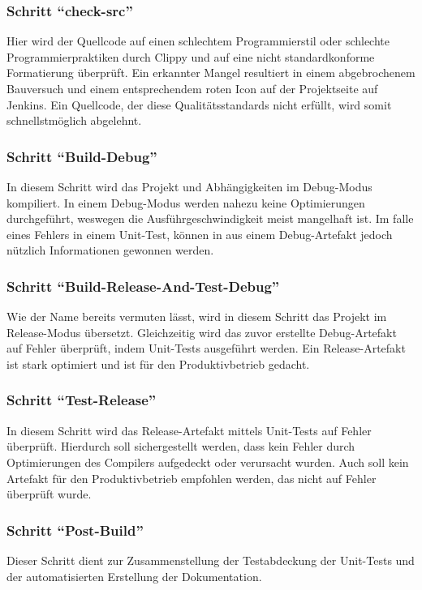 \subsubsection{Schritt \enquote{check-src}}
Hier wird der Quellcode auf einen schlechtem Programmierstil oder schlechte Programmierpraktiken durch Clippy und auf eine nicht standardkonforme Formatierung überprüft.
Ein erkannter Mangel resultiert in einem abgebrochenem Bauversuch und einem entsprechendem roten Icon auf der Projektseite auf Jenkins.
Ein Quellcode, der diese Qualitätsstandards nicht erfüllt, wird somit schnellstmöglich abgelehnt.

\subsubsection{Schritt \enquote{Build-Debug}}
In diesem Schritt wird das Projekt und Abhängigkeiten im Debug-Modus kompiliert.
In einem Debug-Modus werden nahezu keine Optimierungen durchgeführt, weswegen die Ausführgeschwindigkeit meist mangelhaft ist.
Im falle eines Fehlers in einem Unit-Test, können in aus einem Debug-Artefakt jedoch nützlich Informationen gewonnen werden.

\subsubsection{Schritt \enquote{Build-Release-And-Test-Debug}}
Wie der Name bereits vermuten lässt, wird in diesem Schritt das Projekt im Release-Modus übersetzt.
Gleichzeitig wird das zuvor erstellte Debug-Artefakt auf Fehler überprüft, indem Unit-Tests ausgeführt werden.
Ein Release-Artefakt ist stark optimiert und ist für den Produktivbetrieb gedacht.

\subsubsection{Schritt \enquote{Test-Release}}
In diesem Schritt wird das Release-Artefakt mittels Unit-Tests auf Fehler überprüft.
Hierdurch soll sichergestellt werden, dass kein Fehler durch Optimierungen des Compilers aufgedeckt oder verursacht wurden.
 Auch soll kein Artefakt für den Produktivbetrieb empfohlen werden, das nicht auf Fehler überprüft wurde.

\subsubsection{Schritt \enquote{Post-Build}}
Dieser Schritt dient zur Zusammenstellung der Testabdeckung der Unit-Tests und der automatisierten  Erstellung der Dokumentation.

